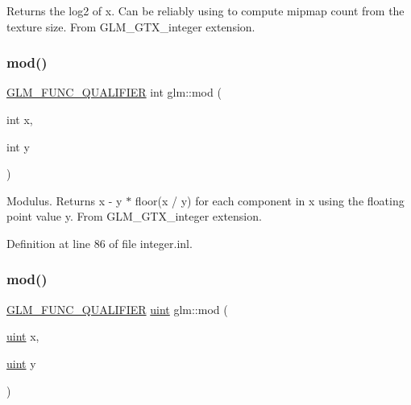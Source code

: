 Returns the log2 of x. Can be reliably using to compute mipmap count from the texture size. From G\+L\+M\+\_\+\+G\+T\+X\+\_\+integer extension. \mbox{\label{group__gtx__integer_gab9d22df91aac4d9eb925a4910f556f1b}} 
\subsubsection{\texorpdfstring{mod()}{mod()}\hspace{0.1cm}{\footnotesize\ttfamily [1/2]}}
{\footnotesize\ttfamily \hyperlink{setup_8hpp_a33fdea6f91c5f834105f7415e2a64407}{G\+L\+M\+\_\+\+F\+U\+N\+C\+\_\+\+Q\+U\+A\+L\+I\+F\+I\+ER} int glm\+::mod (\begin{DoxyParamCaption}\item[{int}]{x,  }\item[{int}]{y }\end{DoxyParamCaption})}

Modulus. Returns x -\/ y $\ast$ floor(x / y) for each component in x using the floating point value y. From G\+L\+M\+\_\+\+G\+T\+X\+\_\+integer extension. 

Definition at line 86 of file integer.\+inl.

\mbox{\label{group__gtx__integer_gab8f9ec0ca93ca90669434224818f0750}} 
\subsubsection{\texorpdfstring{mod()}{mod()}\hspace{0.1cm}{\footnotesize\ttfamily [2/2]}}
{\footnotesize\ttfamily \hyperlink{setup_8hpp_a33fdea6f91c5f834105f7415e2a64407}{G\+L\+M\+\_\+\+F\+U\+N\+C\+\_\+\+Q\+U\+A\+L\+I\+F\+I\+ER} \hyperlink{group__core__precision_ga4fd29415871152bfb5abd588334147c8}{uint} glm\+::mod (\begin{DoxyParamCaption}\item[{\hyperlink{group__core__precision_ga4fd29415871152bfb5abd588334147c8}{uint}}]{x,  }\item[{\hyperlink{group__core__precision_ga4fd29415871152bfb5abd588334147c8}{uint}}]{y }\end{DoxyParamCaption})}

